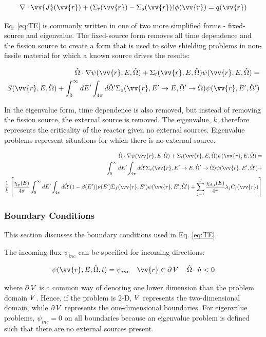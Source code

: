 \documentclass[10pt]{article}
\newcommand{\beq}{\begin{equation}}
\newcommand{\eeq}{\end{equation}}
\newcommand{\beqa}{\begin{equation}\begin{aligned}}
\newcommand{\eeqa}{\end{aligned}\end{equation}}
\newcommand{\hO}{\hat{\Omega}}
\newcommand{\spa}{(\vv{r}, E, \hO, t)}
\newcounter{subsubsubsection}[subsubsection]
\newcommand{\volume}{\mathop{\ooalign{\hfil$V$\hfil\cr\kern0.08em--\hfil\cr}}\nolimits}
\begin{document}
\begin{flushleft}
\beq
\nabla\cdot\vv{J}(\vv{r})+(\Sigma_t(\vv{r})-\Sigma_s(\vv{r}))\phi(\vv{r})=q(\vv{r})
\eeq

Eq. \eqref{eq:TE} is commonly written in one of two more simplified forms - fixed-source and eigenvalue. The fixed-source form removes all time dependence and the fission source to create a form that is used to solve shielding problems in non-fissile material for which a known source drives the results:

\beqa
\label{eq:TE_fixedsource}
 \hO  \cdot\nabla\psi(\vv{r},E,\hO)  + 
 \Sigma_t(\vv{r},E,\hO)\psi(\vv{r},E,\hO)  = \\
S(\vv{r},E,\hO)  + \int_{0}^{\infty}dE' \int_{4\pi}^{ } d\hO  ' \Sigma_s(\vv{r}, E'\rightarrow E, \hO  '\rightarrow\hO  )\psi(\vv{r},E',\hO')\\
\eeqa

In the eigenvalue form, time dependence is also removed, but instead of removing the fission source, the external source is removed. The eigenvalue, \(k\), therefore represents the criticality of the reactor given no external sources. Eigenvalue problems represent situations for which there is no external source.

\beqa
\label{eq:TE_eigenvalue}
 \hO  \cdot\nabla\psi(\vv{r},E,\hO)  + 
 \Sigma_t(\vv{r},E,\hO)\psi(\vv{r},E,\hO)  = \\
\int_{0}^{\infty}dE' \int_{4\pi}^{ } d\hO  ' \Sigma_s(\vv{r}, E'\rightarrow E, \hO  '\rightarrow\hO  )\psi(\vv{r},E',\hO') + \\
 \frac{1}{k}\left\lbrack\frac{\chi_p(E)}{4\pi} \int_{0}^{\infty} dE'\int_{4\pi}^{} d\hO  '(1-\beta(E'))\nu(E')\Sigma_f(\vv{r}, E')\psi(\vv{r},E',\hO')+
 \sum_{j = 1}^{J} \frac{\chi_{d,j}(E)}{4\pi} \lambda_j C_j(\vv{r})\right\rbrack\\
\eeqa

\subsubsection{Boundary Conditions}

This section discusses the boundary conditions used in Eq. \eqref{eq:TE}.

The incoming flux \(\psi_{inc}\) can be specified for incoming directions:

\beq
\psi\spa =\psi_{inc}\quad\vv{r}\in \partial \volume\quad\hO  \cdot\hat{n}<0
\eeq

where \(\partial\volume\) is a common way of denoting one lower dimension than the problem domain \(\volume\). Hence, if the problem is 2-D, \(\volume\) represents the two-dimensional domain, while \(\partial \volume\) represents the one-dimensional boundaries. For eigenvalue problems, \(\psi_{inc}=0\) on all boundaries because an eigenvalue problem is defined such that there are no external sources present. 


\end{flushleft}
\end{document}
